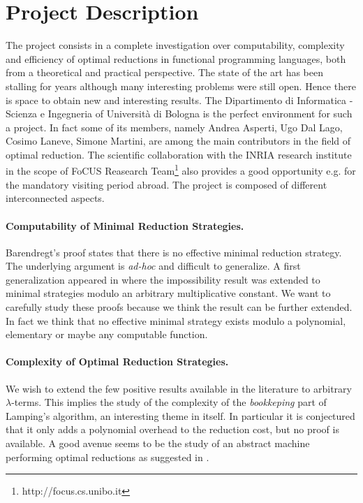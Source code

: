 \documentclass[english]{scrartcl}
\begin{document}
\section{Project Description}
The project consists in a complete investigation over computability, complexity and efficiency of optimal reductions in functional programming languages, both from a theoretical and practical perspective. The state of the art has been stalling for years although many interesting problems were still open. Hence there is space to obtain new and interesting results. The Dipartimento di Informatica - Scienza e Ingegneria of Università di Bologna is the perfect environment for such a project. In fact some of its members, namely Andrea Asperti, Ugo Dal Lago, Cosimo Laneve, Simone Martini, are among the main contributors in the field of optimal reduction. The scientific collaboration with the INRIA research institute in the scope of FoCUS Reasearch Team\footnote{http://focus.cs.unibo.it} also provides a good opportunity e.g. for the mandatory visiting period abroad. The project is composed of different interconnected aspects.
\paragraph{Computability of Minimal Reduction Strategies.}Barendregt's proof \cite[Section~13.5]{barendregt_lambda_1984} states that there is no effective minimal reduction strategy. The underlying argument is \emph{ad-hoc} and difficult to generalize. A first generalization appeared in \cite[Appendix]{kathail_optimal_1990} where the impossibility result was extended to minimal strategies modulo an arbitrary multiplicative constant. We want to carefully study these proofs because we think the result can be further extended. In fact we think that no effective minimal strategy exists modulo a polynomial, elementary or maybe any computable function.
\paragraph{Complexity of Optimal Reduction Strategies.}We wish to extend the few positive results available in the literature \cite{baillot_light_2011,guerrini_is_2017} to arbitrary $\lambda$-terms. This implies the study of the complexity of the \emph{bookkeping} part of Lamping's algorithm, an interesting theme in itself. In particular it is conjectured that it only adds a polynomial overhead to the reduction cost, but no proof is available. A good avenue seems to be the study of an abstract machine performing optimal reductions as suggested in \cite{danos_reversible_1999}. 
\end{document}
